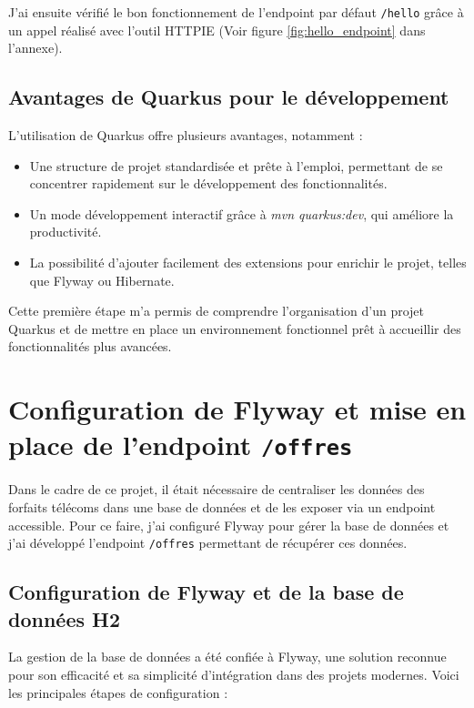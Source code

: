 \documentclass{article}
\begin{document}
	J’ai ensuite vérifié le bon fonctionnement de l’endpoint par défaut \texttt{/hello} grâce à un appel réalisé avec l’outil HTTPIE (Voir figure \ref{fig:hello_endpoint} dans l'annexe).
	
	\subsection{Avantages de Quarkus pour le développement}
	
	L’utilisation de Quarkus offre plusieurs avantages, notamment :
	\begin{itemize}
		\item Une structure de projet standardisée et prête à l’emploi, permettant de se concentrer rapidement sur le développement des fonctionnalités.
		\item Un mode développement interactif grâce à \textit{mvn quarkus:dev}, qui améliore la productivité.
		\item La possibilité d’ajouter facilement des extensions pour enrichir le projet, telles que Flyway ou Hibernate.
	\end{itemize}
	
	Cette première étape m’a permis de comprendre l’organisation d’un projet Quarkus et de mettre en place un environnement fonctionnel prêt à accueillir des fonctionnalités plus avancées.
	
	\section{Configuration de Flyway et mise en place de l'endpoint \texttt{/offres}}
	
	Dans le cadre de ce projet, il était nécessaire de centraliser les données des forfaits télécoms dans une base de données et de les exposer via un endpoint accessible. Pour ce faire, j'ai configuré Flyway pour gérer la base de données et j'ai développé l'endpoint \texttt{/offres} permettant de récupérer ces données.
	
	\subsection{Configuration de Flyway et de la base de données H2}
	
	La gestion de la base de données a été confiée à Flyway, une solution reconnue pour son efficacité et sa simplicité d'intégration dans des projets modernes. Voici les principales étapes de configuration :
	
\end{document}
